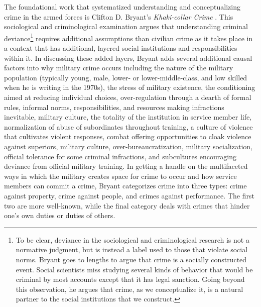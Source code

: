 The foundational work that systematized understanding and conceptualizing crime in the armed forces is Clifton D. Bryant's \textit{Khaki-collar Crime} \citeyear{Bryant1979}. This sociological and criminological examination argues that understanding criminal deviance\footnote{To be clear, deviance in the sociological and criminological research is not a normative judgment, but is instead a label used to those that violate social norms. Bryant goes to lengths to argue that crime is a socially constructed event. Social scientists miss studying several kinds of behavior that would be criminal by most accounts except that it has legal sanction. Going beyond this observation, he argues that crime, as we conceptualize it, is a natural partner to the social institutions that we construct.} requires additional assumptions than civilian crime as it takes place in a context that has additional, layered social institutions and responsibilities within it. In discussing these added layers, Bryant adds several additional causal factors into why military crime occurs including the nature of the military population (typically young, male, lower- or lower-middle-class, and low skilled when he is writing in the 1970s), the stress of military existence, the conditioning aimed at reducing individual choices, over-regulation through a dearth of formal rules, informal norms, responsibilities, and resources making infractions inevitable, military culture, the totality of the institution in service member life, normalization of abuse of subordinates throughout training, a culture of violence that cultivates violent responses, combat offering opportunities to cloak violence against superiors, military culture, over-bureaucratization, military socialization, official tolerance for some criminal infractions, and subcultures encouraging deviance from official military training. In getting a handle on the multifaceted ways in which the military creates space for crime to occur and how service members can commit a crime, Bryant categorizes crime into three types: crime against property, crime against people, and crimes against performance. The first two are more well-known, while the final category deals with crimes that hinder one's own duties or duties of others.


